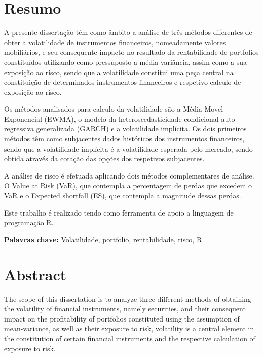 \documentclass[
  12pt,
  a4paper,
  openany]{book}
\begin{document}
\clearpage

\chapter*{Resumo}
\fontsize{12}{21}\selectfont
A presente dissertação têm como âmbito a análise de três métodos diferentes de obter a volatilidade de instrumentos financeiros, nomeadamente valores mobiliários, e seu consequente impacto no resultado da rentabilidade de portfolios constituídos utilizando como pressuposto a média variância, assim como a sua exposição ao risco, sendo que a volatilidade constitui uma peça central na constituição de determinados instrumentos financeiros e respetivo calculo de exposição ao risco.

Os métodos analisados para calculo da volatilidade são a Média Movel Exponencial (EWMA), o modelo da heteroscedasticidade condicional auto-regressiva generalizada (GARCH) e a volatilidade implícita. Os dois primeiros métodos têm como subjacentes dados históricos dos instrumentos financeiros, sendo que a volatilidade implícita é a volatilidade esperada pelo mercado, sendo obtida através da cotação das opções dos respetivos subjacentes.

A análise de risco é efetuada aplicando dois métodos complementares de análise. O Value at Risk (VaR), que contempla a percentagem de perdas que excedem o VaR e o Expected shortfall (ES), que contempla a magnitude dessas perdas.

Este trabalho é realizado tendo como ferramenta de apoio a linguagem de programação R.
\bigbreak

\noindent\textbf{Palavras chave:} Volatilidade, portfolio, rentabilidade, risco, R




\setcounter{page}{2}

\chapter*{Abstract}
\fontsize{12}{21}\selectfont
The scope of this dissertation is to analyze three different methods of obtaining the volatility of financial instruments, namely securities, and their consequent impact on the profitability of portfolios constituted using the assumption of mean-variance, as well as their exposure to risk, volatility is a central element in the constitution of certain financial instruments and the respective calculation of exposure to risk.
\end{document}
